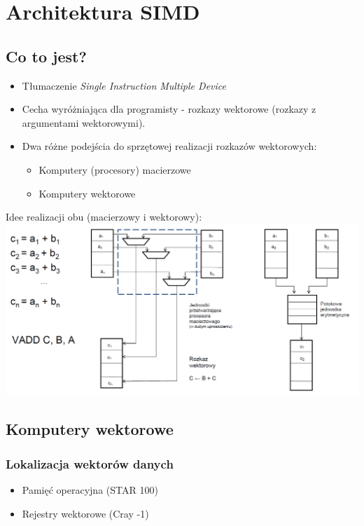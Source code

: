 \documentclass[a4paper,twoside]{article}
\begin{document}
\section{Architektura SIMD}
\begin{samepage}
	\subsection{Co to jest?}
	\begin{itemize}
		\item Tłumaczenie \emph{Single Instruction Multiple Device}
		\item Cecha wyróżniająca dla programisty - rozkazy wektorowe (rozkazy z argumentami wektorowymi).
		\item Dwa różne podejścia do sprzętowej realizacji rozkazów wektorowych:
		\begin{itemize}
			\item Komputery (procesory) macierzowe
			\item Komputery wektorowe
		\end{itemize}
	\end{itemize}
	Idee realizacji obu (macierzowy i wektorowy):\\
	\includegraphics[width=16cm]{wektor_macierz}\\
\end{samepage}
\subsection{Komputery wektorowe}
\label{ss:wektor}
\subsubsection{Lokalizacja wektorów danych}
\begin{itemize}
	\item Pamięć operacyjna (STAR 100)
	\item Rejestry wektorowe (Cray -1)
\end{itemize}
\end{document}
